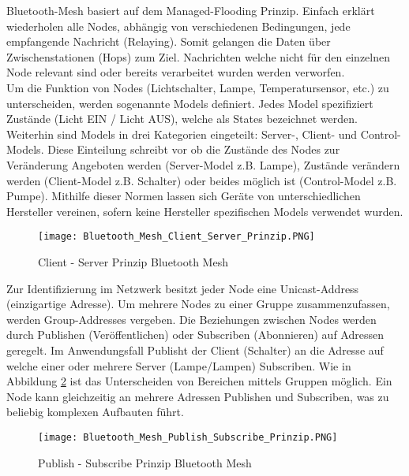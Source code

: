 
Bluetooth-Mesh basiert auf dem Managed-Flooding Prinzip. Einfach erklärt wiederholen alle Nodes, abhängig von verschiedenen Bedingungen, jede empfangende Nachricht (Relaying). Somit gelangen die Daten über Zwischenstationen (Hops) zum Ziel. Nachrichten welche nicht für den einzelnen Node relevant sind oder bereits verarbeitet wurden werden verworfen. \\

Um die Funktion von Nodes (Lichtschalter, Lampe, Temperatursensor, etc.) zu unterscheiden, werden sogenannte Models definiert. Jedes Model spezifiziert Zustände (Licht EIN / Licht AUS), welche als States bezeichnet werden. Weiterhin sind Models in drei Kategorien eingeteilt: Server-, Client- und Control-Models. Diese Einteilung schreibt vor ob die Zustände des Nodes zur Veränderung Angeboten werden (Server-Model z.B. Lampe), Zustände verändern werden (Client-Model z.B. Schalter) oder beides möglich ist (Control-Model z.B. Pumpe). Mithilfe dieser Normen lassen sich Geräte von unterschiedlichen Hersteller vereinen, sofern keine Hersteller spezifischen Models verwendet wurden. 

\begin{figure} [H]
	\centering
	\texttt{[image: Bluetooth\_Mesh\_Client\_Server\_Prinzip.PNG]}
	\caption{Client - Server Prinzip Bluetooth Mesh \cite{bluetooth_sig_mesh-technology-overviewpdf_2020}} 
	\label{fig:BTMeshClientServerPrinzip}
\end{figure}


Zur Identifizierung im Netzwerk besitzt jeder Node eine Unicast-Address (einzigartige Adresse). Um mehrere Nodes zu einer Gruppe zusammenzufassen, werden Group-Addresses vergeben. Die Beziehungen zwischen Nodes werden durch Publishen (Veröffentlichen) oder Subscriben (Abonnieren) auf Adressen geregelt. Im Anwendungsfall Publisht der Client (Schalter) an die Adresse auf welche einer oder mehrere Server (Lampe/Lampen) Subscriben. Wie in Abbildung \ref{fig:BTMeshPublishSubscribePrinzip} ist das Unterscheiden von Bereichen mittels Gruppen möglich. Ein Node kann gleichzeitig an mehrere Adressen Publishen und Subscriben, was zu beliebig komplexen Aufbauten führt. 


\begin{figure} [H]
	\centering
	\texttt{[image: Bluetooth\_Mesh\_Publish\_Subscribe\_Prinzip.PNG]}
	\caption{Publish - Subscribe Prinzip Bluetooth Mesh \cite{bluetooth_sig_mesh-technology-overviewpdf_2020}} 
	\label{fig:BTMeshPublishSubscribePrinzip}
\end{figure}










